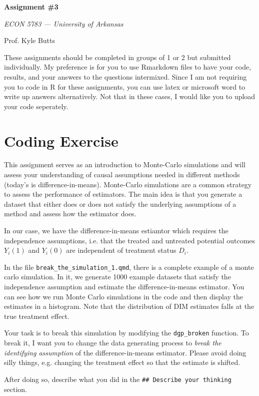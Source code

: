 \documentclass[12pt]{article}
\begin{document}
\begin{center}
  {\Huge\bf Assignment \#3}
  
  \smallskip
  {\large\it  ECON 5783 — University of Arkansas}

  \medskip
  {\large Prof. Kyle Butts}
\end{center}

These assignments should be completed in groups of 1 or 2 but submitted individually. My preference is for you to use Rmarkdown files to have your code, results, and your answers to the questions intermixed. Since I am not requiring you to code in R for these assignments, you can use latex or microsoft word to write up answers alternatively. Not that in these cases, I would like you to upload your code seperately. 

\section*{Coding Exercise}

This assignment serves as an introduction to Monte-Carlo simulations and will assess your understanding of causal assumptions needed in different methods (today's is difference-in-means). Monte-Carlo simulations are a common strategy to assess the performance of estimators. The main idea is that you generate a dataset that either does or does not satisfy the underlying assumptions of a method and assess how the estimator does. 

In our case, we have the difference-in-means estiamtor which requires the independence assumptions, i.e. that the treated and untreated potential outcomes $Y_i(1)$ and $Y_i(0)$ are independent of treatment status $D_i$. 

In the file \texttt{break\_the\_simulation\_1.qmd}, there is a complete example of a monte carlo simulation. In it, we generate 1000 example datasets that satisfy the independence assumption and estimate the difference-in-means estimator. You can see how we run Monte Carlo simulations in the code and then display the estimates in a histogram. Note that the distribution of DIM estimates falls at the true treatment effect.

Your task is to break this simulation by modifying the \texttt{dgp\_broken} function. To break it, I want you to change the data generating process to \emph{break the identifying assumption} of the difference-in-means estimator. Please avoid doing silly things, e.g. changing the treatment effect so that the estimate is shifted.  


After doing so, describe what you did in the \texttt{\#\# Describe your thinking} section.
\end{document}
